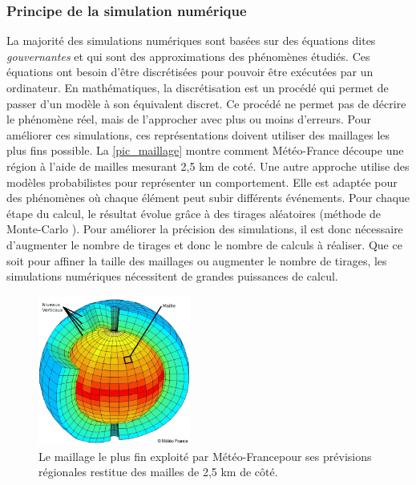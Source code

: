     
     
    \subsubsection{Principe de la simulation numérique}
    
        La majorité des simulations numériques sont basées sur des équations dites \textit{gouvernantes} et qui sont des approximations des phénomènes étudiés. Ces équations ont besoin d'être discrétisées pour pouvoir être exécutées par un ordinateur. En mathématiques, la discrétisation est un procédé qui permet de passer d'un modèle à son équivalent discret. Ce procédé ne permet pas de décrire le phénomène réel, mais de l'approcher avec plus ou moins d'erreurs. Pour améliorer ces simulations, ces représentations doivent utiliser des maillages les plus fins possible. La \autoref{pic_maillage} montre comment Météo-France découpe une région à l'aide de mailles mesurant 2,5 km de coté. Une autre approche utilise des modèles probabilistes pour représenter un comportement. Elle est adaptée pour des phénomènes où chaque élément peut subir différents événements. Pour chaque étape du calcul, le résultat évolue grâce à des tirages aléatoires (méthode de Monte-Carlo \cite{Kroese2014}). Pour améliorer la précision des simulations, il est donc nécessaire d'augmenter le nombre de tirages et donc le nombre de calculs à réaliser.
        Que ce soit pour affiner la taille des maillages ou augmenter le nombre de tirages, les simulations numériques nécessitent de grandes puissances de calcul. 
            
            \begin{figure}
            \center
            \includegraphics[width=5cm]{images/Chapitre1/maillage.png}
            \caption{\label{pic_maillage} Le maillage le plus fin exploité par Météo-France\protect\footnotemark pour ses prévisions régionales restitue des mailles de 2,5 km de côté.}
            \end{figure}

